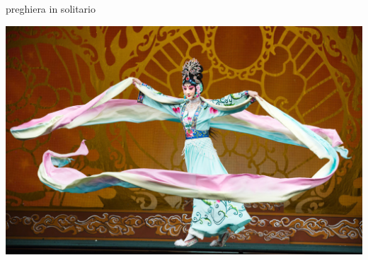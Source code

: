 \documentclass[presentation]{beamer}
\begin{document}
\begin{frame}[label={sec:org90238cb}]{preghiera in solitario}
\begin{center}
\includegraphics[width=.9\linewidth]{./immagini/gnocca_volante.jpg}
\end{center}
\end{frame}
\end{document}
